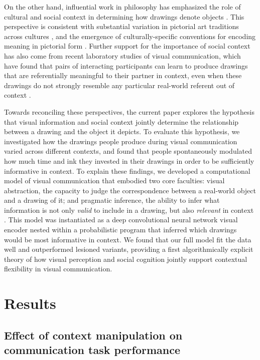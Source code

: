 \documentclass[9pt,twocolumn,twoside]{pnas-new}
\begin{document}
On the other hand, influential work in philosophy has emphasized the role of cultural and social context in determining how drawings denote objects \cite{goodman1976languages}.
This perspective is consistent with substantial variation in pictorial art traditions across cultures \cite{gombrich1989story,gombrich1969art}, and the emergence of culturally-specific conventions for encoding meaning in pictorial form \cite{boltz1994origin,allen2000middle}. 
Further support for the importance of social context has also come from recent laboratory studies of visual communication, which have found that pairs of interacting participants can learn to produce drawings that are referentially meaningful to their partner in context, even when these drawings do not strongly resemble any particular real-world referent out of context \cite{Garrod:2007wk,fay2010interactive,Galantucci:2005uh}. 

Towards reconciling these perspectives, the current paper explores the hypothesis that visual information and social context jointly determine the relationship between a drawing and the object it depicts.  
To evaluate this hypothesis, we investigated how the drawings people produce during visual communication varied across different contexts, and found that people spontaneously modulated how much time and ink they invested in their drawings in order to be sufficiently informative in context.
To explain these findings, we developed a computational model of visual communication that embodied two core faculties: visual abstraction, the capacity to judge the correspondence between a real-world object and a drawing of it; and pragmatic inference, the ability to infer what information is not only \textit{valid} to include in a drawing, but also \textit{relevant} in context  \cite{goodman2016pragmatic,grice1975syntax,abell2009canny}.
This model was instantiated as a deep convolutional neural network visual encoder nested within a probabilistic program that inferred which drawings would be most informative in context.
We found that our full model fit the data well and outperformed lesioned variants, providing a first algorithmically explicit theory of how visual perception and social cognition jointly support contextual flexibility in visual communication.

\section*{Results}

\subsection*{Effect of context manipulation on communication task performance}
\end{document}
